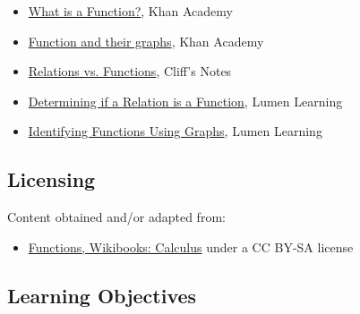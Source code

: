 \begin{itemize}
    \item \href{https://www.khanacademy.org/math/algebra/x2f8bb11595b61c86:functions/x2f8bb11595b61c86:evaluating-functions/v/what-is-a-function}{What is a Function?}, Khan Academy
    \item \href{https://www.khanacademy.org/math/algebra2/functions_and_graphs}{Function and their graphs}, Khan Academy
    \item \href{https://www.cliffsnotes.com/study-guides/calculus/precalculus/functions/relations-vs-functions}{Relations vs. Functions}, Cliff's Notes
    \item \href{https://courses.lumenlearning.com/ivytech-collegealgebra/chapter/determine-whether-a-relation-represents-a-function/}{Determining if a Relation is a Function}, Lumen Learning
    \item \href{https://courses.lumenlearning.com/waymakercollegealgebra/chapter/identify-functions-using-graphs/}{Identifying Functions Using Graphs}, Lumen Learning
\end{itemize}


\subsection{Licensing}
\label{sss:lice-73528}




Content obtained and/or adapted from:



\begin{itemize}
    \item \href{https://en.wikibooks.org/wiki/Calculus/Functions}{Functions, Wikibooks: Calculus} under a CC BY-SA license
\end{itemize}


\subsection{Learning Objectives}
\label{ssec:lear-fe6e}


